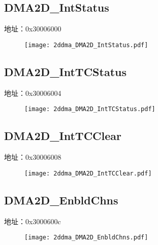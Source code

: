 \subsection{DMA2D\_IntStatus}
\label{2ddma-DMA2D-IntStatus}
地址：0x30006000
 \begin{figure}[H]
\texttt{[image: 2ddma\_DMA2D\_IntStatus.pdf]}
\end{figure}

\subsection{DMA2D\_IntTCStatus}
\label{2ddma-DMA2D-IntTCStatus}
地址：0x30006004
 \begin{figure}[H]
\texttt{[image: 2ddma\_DMA2D\_IntTCStatus.pdf]}
\end{figure}

\subsection{DMA2D\_IntTCClear}
\label{2ddma-DMA2D-IntTCClear}
地址：0x30006008
 \begin{figure}[H]
\texttt{[image: 2ddma\_DMA2D\_IntTCClear.pdf]}
\end{figure}

\subsection{DMA2D\_EnbldChns}
\label{2ddma-DMA2D-EnbldChns}
地址：0x3000600c
 \begin{figure}[H]
\texttt{[image: 2ddma\_DMA2D\_EnbldChns.pdf]}
\end{figure}

